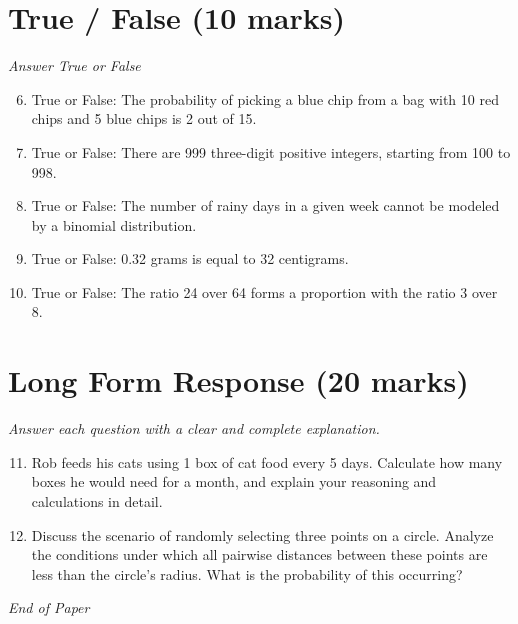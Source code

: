 \documentclass[12pt]{article}
\begin{document}
\section*{True / False (10 marks)}
\textit{Answer True or False}
\begin{enumerate}[label=\arabic*.]
\setcounter{enumi}{5}
\item True or False: The probability of picking a blue chip from a bag with 10 red chips and 5 blue chips is 2 out of 15.
\item True or False: There are 999 three-digit positive integers, starting from 100 to 998.
\item True or False: The number of rainy days in a given week cannot be modeled by a binomial distribution.
\item True or False: 0.32 grams is equal to 32 centigrams.
\item True or False: The ratio 24 over 64 forms a proportion with the ratio 3 over 8.
\end{enumerate}

\section*{Long Form Response (20 marks)}
\textit{Answer each question with a clear and complete explanation.}
\begin{enumerate}[label=\arabic*.]
\setcounter{enumi}{10}
\item Rob feeds his cats using 1 box of cat food every 5 days. Calculate how many boxes he would need for a month, and explain your reasoning and calculations in detail.
\item Discuss the scenario of randomly selecting three points on a circle. Analyze the conditions under which all pairwise distances between these points are less than the circle's radius. What is the probability of this occurring?
\end{enumerate}

\vfill
\noindent\textit{End of Paper}
\end{document}
